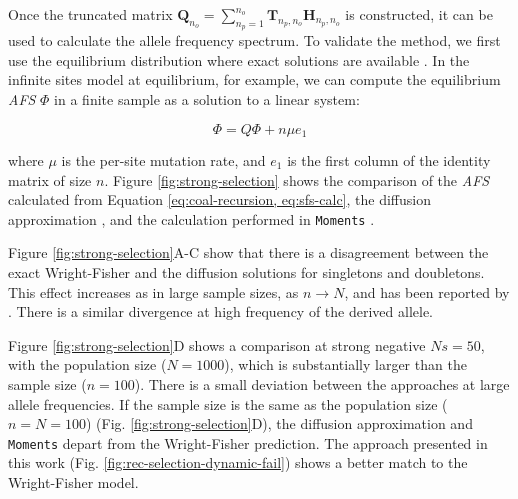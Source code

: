 \documentclass[review]{elsarticle}
\newcommand{\ra}{\rightarrow}
\newcommand{\sgcomment}[1]{{\color{red}{SG: #1}}}
\begin{document}
Once the truncated matrix
$\mathbf{Q}_{n_o} = \sum_{n_p=1}^{n_{o}} \mathbf{T}_{n_p,n_o} \mathbf{H}_{n_p,n_o}$ is constructed,
it can be used to calculate the allele frequency spectrum. To validate the method, we first use the
equilibrium distribution where exact solutions are available \cite{Krukov2016}. In the infinite sites
model at equilibrium, for example, we can compute the equilibrium \textit{AFS} $\Phi$ in a finite
sample as a solution to a linear system:

\begin{equation}
  \label{eq:sfs-calc}
  \Phi = Q \Phi  + n \mu e_1
\end{equation}

where $\mu$ is the per-site mutation rate, and $e_1$ is the first column of the identity matrix of
size $n$. Figure \ref{fig:strong-selection} shows the comparison of the \textit{AFS} calculated from
Equation \eqref{eq:coal-recursion, eq:sfs-calc}, the diffusion approximation \cite[eq.
9.23]{Ewens2004}, and the calculation performed in \texttt{Moments} \citep{JouganousEtAl2017}.


Figure \ref{fig:strong-selection}A-C show that there is a disagreement between the exact
Wright-Fisher and the diffusion solutions for singletons and doubletons. This effect increases as in
large sample sizes, as $n \ra N$, and has been reported by \citep{BhaskarEtAl2014}. There is a
similar divergence at high frequency of the derived allele.

Figure \ref{fig:strong-selection}D shows a comparison at strong negative $Ns=50$, with the
population size ($N=1000$), which is substantially larger than the sample size ($n=100$). There is a
small deviation between the approaches at large allele frequencies. If the sample size is the same
as the population size ($n=N=100$) (Fig. \ref{fig:strong-selection}D), the diffusion approximation
and \texttt{Moments} depart from the Wright-Fisher prediction. The approach presented in this work
(Fig. \ref{fig:rec-selection-dynamic-fail}) shows a better match to the Wright-Fisher model.
\end{document}

